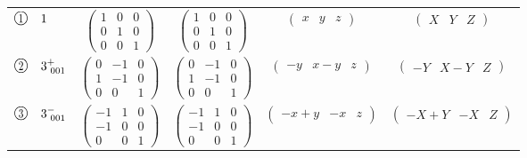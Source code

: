 \documentclass[fleqn,10pt,landscape]{jsarticle}
\begin{document}
\begin{center}
\begin{longtable}{lcccc}
$ {\ooalign{\hfil\resizebox{.8\width}{\height}{1}\hfil\crcr\raise.1ex\hbox{\large$\bigcirc$}}}\quad 1 $ & $ \begin{pmatrix} 1 & 0 & 0 \\ 0 & 1 & 0 \\ 0 & 0 & 1 \end{pmatrix} $ & $ \begin{pmatrix} 1 & 0 & 0 \\ 0 & 1 & 0 \\ 0 & 0 & 1 \end{pmatrix} $ & $ \begin{pmatrix} x & y & z \end{pmatrix} $ & $ \begin{pmatrix} X & Y & Z \end{pmatrix} $ \\
$ {\ooalign{\hfil\resizebox{.8\width}{\height}{2}\hfil\crcr\raise.1ex\hbox{\large$\bigcirc$}}}\quad 3^{+}_{\,\,001} $ & $ \begin{pmatrix} 0 & -1 & 0 \\ 1 & -1 & 0 \\ 0 & 0 & 1 \end{pmatrix} $ & $ \begin{pmatrix} 0 & -1 & 0 \\ 1 & -1 & 0 \\ 0 & 0 & 1 \end{pmatrix} $ & $ \begin{pmatrix} - y & x - y & z \end{pmatrix} $ & $ \begin{pmatrix} - Y & X - Y & Z \end{pmatrix} $ \\
$ {\ooalign{\hfil\resizebox{.8\width}{\height}{3}\hfil\crcr\raise.1ex\hbox{\large$\bigcirc$}}}\quad 3^{-}_{\,\,001} $ & $ \begin{pmatrix} -1 & 1 & 0 \\ -1 & 0 & 0 \\ 0 & 0 & 1 \end{pmatrix} $ & $ \begin{pmatrix} -1 & 1 & 0 \\ -1 & 0 & 0 \\ 0 & 0 & 1 \end{pmatrix} $ & $ \begin{pmatrix} - x + y & - x & z \end{pmatrix} $ & $ \begin{pmatrix} - X + Y & - X & Z \end{pmatrix} $ \\
\end{longtable}
\end{center}
\end{document}
